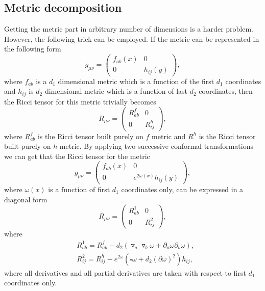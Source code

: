 \documentclass[a4paper,12pt]{article}
\begin{document}
\subsection{Metric decomposition}
Getting the metric part in arbitrary number of dimensions is a harder problem. However, the following trick can be employed. If the metric can be represented in the following form
\begin{equation}
g_{\mu\nu} =\begin{pmatrix}
	f_{ab}(x) & 0 \\
	0 & h_{ij}(y)
\end{pmatrix},
\end{equation}
where $f_{ab}$ is a $d_1$ dimensional metric which is a function of the first $d_1$ coordinates and $h_{ij}$ is $d_2$ dimensional metric which is a function of last $d_2$ coordinates, then the Ricci tensor for this metric trivially becomes
\begin{equation}
	R_{\mu\nu} =\begin{pmatrix}
		R^f_{ab} & 0 \\
		0 & R^h_{ij}
	\end{pmatrix},
\end{equation}
where $R^f_{ab}$ is the Ricci tensor built purely on $f$ metric and $R^h$ is the Ricci tensor built purely on $h$ metric. By applying two successive conformal transformations we can get that the Ricci tensor for the metric 
\begin{equation}
	g_{\mu\nu} =\begin{pmatrix}
		f_{ab}(x) & 0 \\
		0 & e^{2\omega(x)} h_{ij}(y)
	\end{pmatrix},
\end{equation}
where $\omega(x)$ is a function of first $d_1$ coordinates only, can be expressed in a diagonal form
\begin{equation}
R_{\mu\nu} =\begin{pmatrix}
	R^1_{ab} & 0 \\
	0 & R^2_{ij}
\end{pmatrix},
\end{equation}
where
\begin{subequations}
\begin{align}
	&R^1_{ab} = R^f_{ab} - d_2(\triangledown_a \triangledown_b\omega + \partial_a\omega\partial_b\omega),\\
	&R^2_{ij} = R^h_{ij} - e^{2\omega} (\square\omega + d_2(\partial \omega)^2) h_{ij},
\end{align}
\end{subequations}
where all derivatives and all partial derivatives are taken with respect to first $d_1$ coordinates only.
\end{document}
